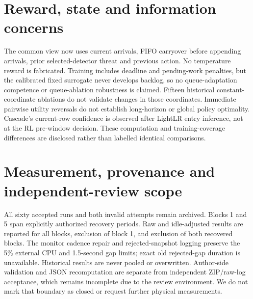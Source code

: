 \documentclass[10pt,a4paper]{article}
\begin{document}
\section*{Reward, state and information concerns}
\begin{responsebox}The common view now uses current arrivals, FIFO carryover before appending arrivals, prior selected-detector threat and previous action. No temperature reward is fabricated. Training includes deadline and pending-work penalties, but the calibrated fixed surrogate never develops backlog, so no queue-adaptation competence or queue-ablation robustness is claimed. Fifteen historical constant-coordinate ablations do not validate changes in those coordinates. Immediate pairwise utility reversals do not establish long-horizon or global policy optimality. Cascade's current-row confidence is observed after LightLR entry inference, not at the RL pre-window decision. These computation and training-coverage differences are disclosed rather than labelled identical comparisons.\end{responsebox}

\section*{Measurement, provenance and independent-review scope}
\begin{responsebox}All sixty accepted runs and both invalid attempts remain archived. Blocks 1 and 5 span explicitly authorized recovery periods. Raw and idle-adjusted results are reported for all blocks, exclusion of block 1, and exclusion of both recovered blocks. The monitor cadence repair and rejected-snapshot logging preserve the 5\% external CPU and 1.5-second gap limits; exact old rejected-gap duration is unavailable. Historical results are never pooled or overwritten. Author-side validation and JSON recomputation are separate from independent ZIP/raw-log acceptance, which remains incomplete due to the review environment. We do not mark that boundary as closed or request further physical measurements.\end{responsebox}
\end{document}
